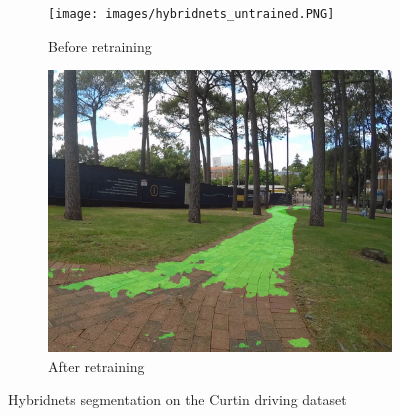 \begin{figure}[p]
    \centering
    \begin{subfigure}{.47\textwidth}
        \centering
        \texttt{[image: images/hybridnets\_untrained.PNG]}
        \caption{Before retraining}
    \end{subfigure}
    \quad
    \begin{subfigure}{.47\textwidth}
        \centering
        \includegraphics[width=\linewidth]{images/hybridnets_trained.PNG}
        \caption{After retraining}
    \end{subfigure}
    \caption{Hybridnets segmentation on the Curtin driving dataset}
    \label{fig:compare_trained_hybridnets}
\end{figure}


